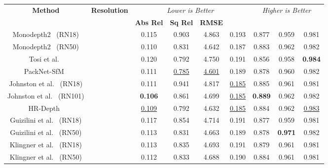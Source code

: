 \documentclass{bmvc2k}
\begin{document}
\begin{table}[t!]
\centering
\scriptsize
\begin{tabular}[h]{ c | c | c  c  c  c | c  c  c}
\hline
\multirow{2}{*}{\textbf{Method}} &\multirow{2}{*}{\textbf{Resolution}} &\multicolumn{4}{c|}{\it Lower is Better} &\multicolumn{3}{c}{\it Higher is Better} \\
& &{\bf Abs Rel} &{\bf Sq Rel} &{\bf RMSE} &{\bf } &{\bf} &{\bf} &{\bf} 	\\
\hline

Monodepth2~\cite{godard2019digging} (RN18) & &0.115 &0.903 &4.863 &0.193 &0.877 &0.959 &0.981 \\

Monodepth2~\cite{godard2019digging} (RN50) & &0.110 &0.831 &4.642 &0.187 &0.883 &0.962 &0.982 \\

Tosi et al.~\cite{tosi2020distilled} & &0.120 &0.792 &4.750 &0.191 &0.856 &0.958 &\textbf{0.984}\\

PackNet-SfM~\cite{guizilini20203d} & &0.111 &\underline{0.785} &\underline{4.601} &0.189 &0.878 &0.960 &0.982 \\

Johnston et al.~\cite{johnston2020self} (RN18) & &0.111 &0.941 &4.817 &\underline{0.185} &0.885 &0.961 &0.981 \\

Johnston et al.~\cite{johnston2020self} (RN101) & &\textbf{0.106} &0.861 &4.699 &\underline{0.185} &\textbf{0.889} &0.962 &0.982 \\

HR-Depth~\cite{lyu2020hr} & &\underline{0.109} &0.792 &4.632 &\underline{0.185} &0.884 &0.962 &\underline{0.983} \\

Guizilini et al.~\cite{guizilini2020semantically} (RN18) & &0.117 &0.854 &4.714 &0.191 &0.877 &0.959 &0.981 \\

Guizilini et al.~\cite{guizilini2020semantically} (RN50) & &0.113 &0.831 &4.663 &0.189 &0.878 &\textbf{0.971} &0.982 \\

Klingner et al.~\cite{klingner2020self} (RN18) & &0.113 &0.835 &4.693 &0.191 &0.879 &0.961 &0.981 \\

Klingner et al.~\cite{klingner2020self} (RN50) & &0.112 &0.833 &4.688 &0.190 &0.884 &0.961 &0.981 \\


\end{tabular}
\end{table}
\end{document}
